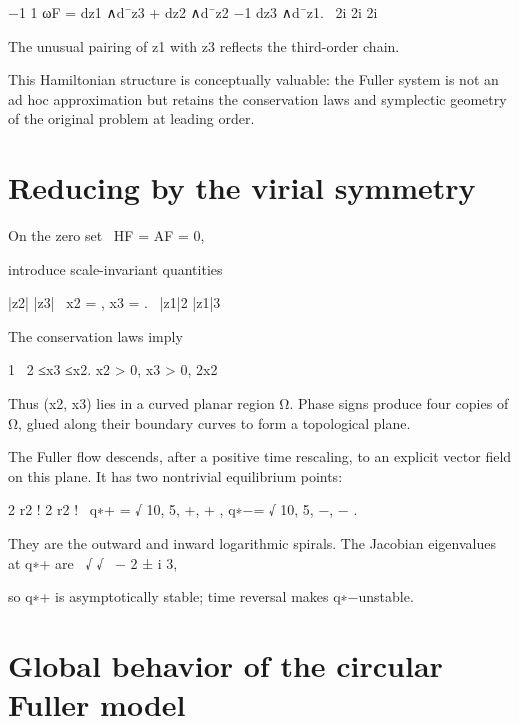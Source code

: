 \begin{displaytext}
−1 1 ωF = dz1 ∧d¯z3 + dz2 ∧d¯z2 −1 dz3 ∧d¯z1. \
2i 2i 2i
\end{displaytext}

The unusual pairing of z1 with z3 reflects the third-order chain.


This Hamiltonian structure is conceptually valuable: the Fuller system is not an ad hoc approximation but retains the conservation laws and symplectic geometry of the original problem at leading order.


\section{Reducing by the virial symmetry}

\begin{displaytext}
On the zero set \
HF = AF = 0,
\end{displaytext}

introduce scale-invariant quantities


\begin{displaytext}
|z2| |z3| \
x2 = , x3 = . \
|z1|2 |z1|3
\end{displaytext}

The conservation laws imply


\begin{displaytext}
1 \
2 ≤x3 ≤x2. x2 > 0, x3 > 0, 2x2
\end{displaytext}

Thus (x2, x3) lies in a curved planar region Ω. Phase signs produce four copies of Ω, glued along their boundary curves to form a topological plane.


The Fuller flow descends, after a positive time rescaling, to an explicit vector field on this plane. It has two nontrivial equilibrium points:


\begin{displaytext}
2 r2 ! 2 r2 ! \
q∗+ = √ 10, 5, +, + , q∗−= √ 10, 5, −, − .
\end{displaytext}

\begin{displaytext}
They are the outward and inward logarithmic spirals. The Jacobian eigenvalues at q∗+ are \
√ √ \
− 2 ± i 3,
\end{displaytext}

so q∗+ is asymptotically stable; time reversal makes q∗−unstable.


\section{Global behavior of the circular Fuller model}

